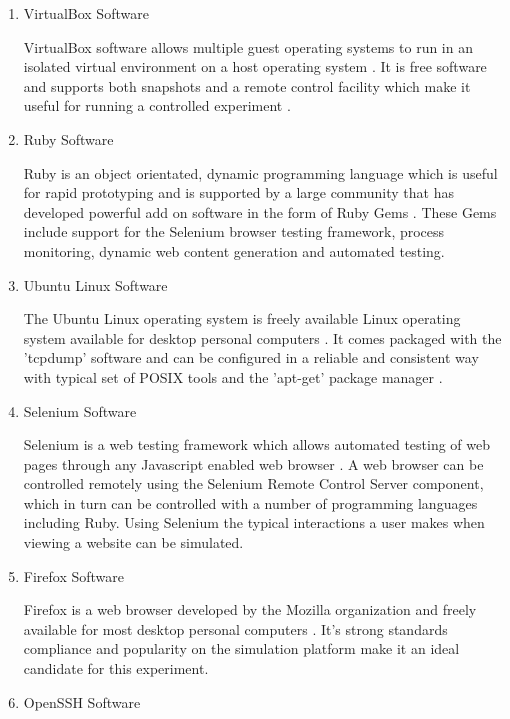 \begin{enumerate}
  \item VirtualBox Software

  VirtualBox software allows multiple guest operating systems to run in an
  isolated virtual environment on a host operating system \parencite{:fk}.
  It is free software and supports both snapshots and a remote control facility
  which make it useful for running a controlled experiment \parencite{Oracle:2011kx}.

  \item Ruby Software

  Ruby is an object orientated, dynamic programming language which is useful for
  rapid prototyping and is supported by a large community that has developed
  powerful add on software in the form of Ruby Gems \parencite{:2010uq}. These
  Gems include support for the Selenium browser testing framework, process
  monitoring, dynamic web content generation and automated testing.

  \item Ubuntu Linux Software

  The Ubuntu Linux operating system is freely available Linux operating system
  available for desktop personal computers \parencite{:2010ly}. It comes
  packaged with the 'tcpdump' software and can be configured in a reliable and
  consistent way with typical set of POSIX tools and the 'apt-get' package
  manager \parencite{Pereira:2011uq}.

  \item Selenium Software

  Selenium is a web testing framework which allows automated testing of web pages
  through any Javascript enabled web browser \parencite{:2010ys}. A web browser
  can be controlled remotely using the Selenium Remote Control Server component,
  which in turn can be controlled with a number of programming languages including
  Ruby. Using Selenium the typical interactions a user makes when viewing a
  website can be simulated.

  \item Firefox Software

  Firefox is a web browser developed by the Mozilla organization and freely
  available for most desktop personal computers \parencite{Foundation:2011fk}.
  It's strong standards compliance \parencite{Hammond:2010fk} and popularity
  \parencite{:2010kx,:2010vn} on the simulation platform make it an ideal
  candidate for this experiment.

  \item OpenSSH Software


\end{enumerate}
